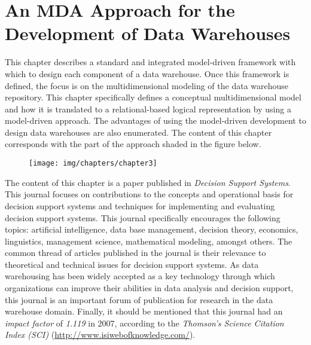 %
%
%



\chapter{An MDA Approach for the Development of Data Warehouses}
\label{c3} %


This chapter describes a standard and integrated model-driven
framework with which to design each component of a data warehouse.
Once this framework is defined, the focus is on the multidimensional
modeling of the data warehouse repository. This chapter specifically
defines a conceptual multidimensional model and how it is translated
to a relational-based logical representation by using a model-driven
approach. The advantages of using the model-driven development to
design data warehouses are also enumerated. The content of this
chapter corresponds with the part of the approach shaded in the
figure below.

\begin{figure}[h!]
  \begin{center}
    \texttt{[image: img/chapters/chapter3]}
  \end{center}
\end{figure}

The content of this chapter is a paper published in \emph{Decision
Support Systems}. This journal focuses on contributions to the
concepts and operational basis for decision support systems and
techniques for implementing and evaluating decision support systems.
This journal specifically encourages the following topics:
artificial intelligence, data base management, decision theory,
economics, linguistics, management science, mathematical modeling,
amongst others. The common thread of articles published in the
journal is their relevance to theoretical and technical issues for
decision support systems. As data warehousing has been widely
accepted as a key technology through which organizations can improve
their abilities in data analysis and decision support, this journal
is an important forum of publication for research in the data
warehouse domain. Finally, it should be mentioned that this journal
had an \emph{impact factor} of \emph{1.119} in 2007, according to
the \emph{Thomson's Science Citation Index (SCI)}
(\url{http://www.isiwebofknowledge.com/}).






%
